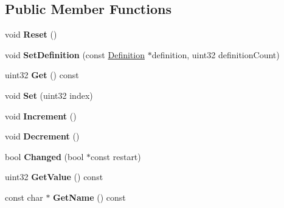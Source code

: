 \subsection*{Public Member Functions}
\begin{DoxyCompactItemize}
\item 
\hypertarget{classParticleParameter_ab364517111e011353969f6eb788f1a23}{void {\bfseries Reset} ()}\label{classParticleParameter_ab364517111e011353969f6eb788f1a23}

\item 
\hypertarget{classParticleParameter_a3cf2c26fae4f3f8a785ec58f482e9b1c}{void {\bfseries Set\-Definition} (const \hyperlink{structParticleParameter_1_1Definition}{Definition} $\ast$definition, uint32 definition\-Count)}\label{classParticleParameter_a3cf2c26fae4f3f8a785ec58f482e9b1c}

\item 
\hypertarget{classParticleParameter_a6521c78d03d49ddd7e991b6a28a505fc}{uint32 {\bfseries Get} () const }\label{classParticleParameter_a6521c78d03d49ddd7e991b6a28a505fc}

\item 
\hypertarget{classParticleParameter_a89d8370d708af000e429cbd761c713b9}{void {\bfseries Set} (uint32 index)}\label{classParticleParameter_a89d8370d708af000e429cbd761c713b9}

\item 
\hypertarget{classParticleParameter_ae4af7a60b490d80fcd28f4a571673e74}{void {\bfseries Increment} ()}\label{classParticleParameter_ae4af7a60b490d80fcd28f4a571673e74}

\item 
\hypertarget{classParticleParameter_ac9403cb9f9fd39f91e1c2d7264721974}{void {\bfseries Decrement} ()}\label{classParticleParameter_ac9403cb9f9fd39f91e1c2d7264721974}

\item 
\hypertarget{classParticleParameter_a837284864c63aa38ef73a31a669df4a3}{bool {\bfseries Changed} (bool $\ast$const restart)}\label{classParticleParameter_a837284864c63aa38ef73a31a669df4a3}

\item 
\hypertarget{classParticleParameter_a8e3746f690993644badb9b9bf6b11585}{uint32 {\bfseries Get\-Value} () const }\label{classParticleParameter_a8e3746f690993644badb9b9bf6b11585}

\item 
\hypertarget{classParticleParameter_aba29874ea2cc5dc0f79e91e291461889}{const char $\ast$ {\bfseries Get\-Name} () const }\label{classParticleParameter_aba29874ea2cc5dc0f79e91e291461889}


\end{DoxyCompactItemize}

